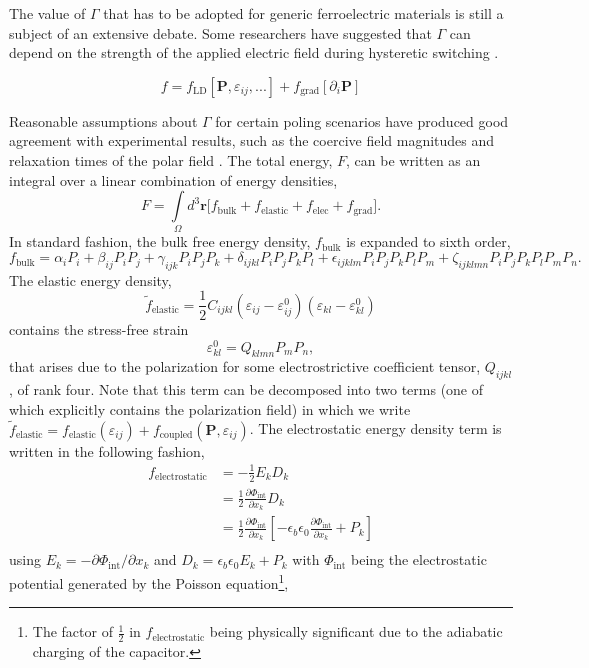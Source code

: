\documentclass[22pt]{article} %
\begin{document}
%
The value of $\Gamma$ that has to be adopted for generic ferroelectric materials is still a subject of an extensive debate. Some researchers have suggested that $\Gamma$ can depend on the strength of the applied electric field during hysteretic switching \cite{Meng2015}.
%

$$f = f_\mathrm{LD} \left[\textbf{P}, \varepsilon_{ij}, ... \right] + f_\mathrm{grad}\left[\partial_i \textbf{P} \right]$$

Reasonable assumptions about $\Gamma$ for certain poling scenarios have produced good agreement with experimental results, such as the coercive field magnitudes and relaxation times of the polar field \cite{Fridkin2000, Hlinka2007}.
%
The total energy, $F$, can be written as an integral over a linear combination of energy densities,
%
$$F = \int\limits_\Omega d^3 \textbf{r} \Bigg[f_\mathrm{bulk} + f_\mathrm{elastic} + f_\mathrm{elec} + f_\mathrm{grad} \Bigg].$$
%
In standard fashion, the bulk free energy density, $f_\mathrm{bulk}$ is expanded to sixth order,
%
$$f_\mathrm{bulk} = \alpha_{i} P_i + \beta_{ij} P_i P_j + \gamma_{ijk} P_i P_j P_k + \delta_{ijkl} P_i P_j P_k P_l  + \epsilon_{ijklm} P_i P_j P_k P_l P_m + \zeta_{ijklmn} P_i P_j P_k P_l P_m P_n.$$
%
The elastic energy density, 
%
$$\widetilde{f}_\mathrm{elastic} = \frac{1}{2} C_{ijkl} \left(\varepsilon_{ij} - \varepsilon_{ij}^0 \right) \left(\varepsilon_{kl} - \varepsilon_{kl}^0 \right) $$
%
contains the stress-free strain
%
$$\varepsilon_{kl}^0 = Q_{klmn} P_m P_n,$$
%
that arises due to the polarization for some electrostrictive coefficient tensor, $Q_{ijkl}$, of rank four. 
%
Note that this term can be decomposed into two terms (one of which explicitly contains the polarization field) in which we write $\widetilde{f}_\mathrm{elastic} = f_\mathrm{elastic}( \varepsilon_{ij}) + f_\mathrm{coupled}(\textbf{P}, \varepsilon_{ij})$.
%
The electrostatic energy density term is written in the following fashion, 
%
\begin{align}\nonumber
f_\mathrm{electrostatic} &= - \frac{1}{2} E_k D_k\\ \nonumber
&= \frac{1}{2} \frac{\partial \Phi_\mathrm{int}}{\partial x_k} D_k\\ \nonumber
&= \frac{1}{2} \frac{\partial \Phi_\mathrm{int}}{\partial x_k} \left[- \epsilon_b \epsilon_0 \frac{\partial \Phi_\mathrm{int}}{\partial x_k}  + P_k\right]\\ \nonumber
\end{align}
%
using $E_k = - \partial \Phi_\mathrm{int} / \partial x_k$ and $D_k = \epsilon_b \epsilon_0 E_k + P_k$ with $\Phi_\mathrm{int}$ being the electrostatic potential generated by the Poisson equation\footnote[4]{The factor of $\frac{1}{2}$ in $f_\mathrm{electrostatic}$ being physically significant due to the adiabatic charging of the capacitor.},
\end{document}
